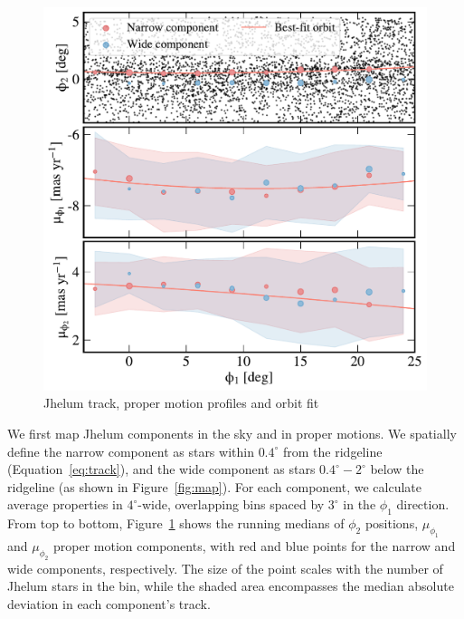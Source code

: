 \documentclass[twocolumn]{aastex62}
\begin{document}
\begin{figure}
\begin{center}
\includegraphics[width=\columnwidth]{components.pdf}
\end{center}
\caption{
Jhelum track, proper motion profiles and orbit fit
}
\label{fig:components}
\end{figure}

We first map Jhelum components in the sky and in proper motions.
We spatially define the narrow component as stars within $0.4^\circ$ from the ridgeline (Equation~\ref{eq:track}), and the wide component as stars $0.4^\circ-2^\circ$ below the ridgeline (as shown in Figure~\ref{fig:map}).
For each component, we calculate average properties in $4^\circ$-wide, overlapping bins spaced by $3^\circ$ in the $\phi_1$ direction.
From top to bottom, Figure~\ref{fig:components} shows the running medians of $\phi_2$ positions, $\mu_{\phi_1}$ and $\mu_{\phi_2}$ proper motion components, with red and blue points for the narrow and wide components, respectively.
The size of the point scales with the number of Jhelum stars in the bin, while the shaded area encompasses the median absolute deviation in each component's track.
\end{document}

